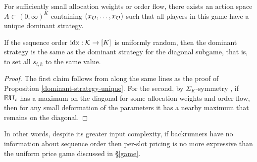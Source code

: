 \begin{proposition} \label{theorem-multi}

  For sufficiently small allocation weights or order flow, there exists an action space $A\subset(0,\infty)^K$ containing $(x_{\mathcal{O}},\ldots,x_{\mathcal{O}})$ such that all players in this game have a unique dominant strategy.

  If the sequence order $\mathrm{idx}:\mathcal{K}\rightarrow[K]$ is uniformly random, then the dominant strategy is the same as the dominant strategy for the diagonal subgame, that is, to set all $s_{i,h}$ to the same value.

\end{proposition}
%
\begin{proof}

  The first claim follows from along the same lines as the proof of Proposition \ref{dominant-strategy-unique}.
  For the second, by $\Sigma_K$-symmetry , if $\mathbb{E}\mathbf{U}_i$ has a maximum on the diagonal for some allocation weights and order flow, then for any small deformation of the parameters it has a nearby maximum that remains on the diagonal.
  \qedhere

\end{proof}

In other words, despite its greater input complexity, if backrunners have no information about sequence order then per-slot pricing is no more expressive than the uniform price game discussed in \S\ref{game}.


